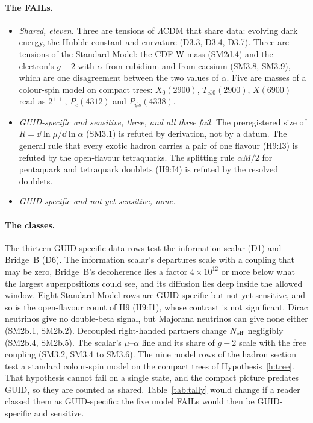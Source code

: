 \paragraph{The FAILs.}
\begin{itemize}[nosep,leftmargin=*]
\item \emph{Shared, eleven.} Three are tensions of $\Lambda$CDM that share data: evolving dark energy, the Hubble constant and curvature
(D3.3, D3.4, D3.7). Three are tensions of the Standard Model: the CDF W mass (SM2d.4) and the electron's $g-2$ with $\alpha$ from rubidium
and from caesium (SM3.8, SM3.9), which are one disagreement between the two values of $\alpha$. Five are masses of a colour-spin model on
compact trees: $X_0(2900)$, $T_{c\bar s0}(2900)$, $X(6900)$ read as $2^{++}$, $P_c(4312)$ and $P_{\psi s}(4338)$.
\item \emph{GUID-specific and sensitive, three, and all three fail.} The preregistered size of $R=\dd\ln\mu/\dd\ln\alpha$ (SM3.1) is refuted
by derivation, not by a datum. The general rule that every exotic hadron carries a pair of one flavour (H9:I3) is refuted by the
open-flavour tetraquarks. The splitting rule $\alpha M/2$ for pentaquark and tetraquark doublets (H9:I4) is refuted by the resolved
doublets.
\item \emph{GUID-specific and not yet sensitive, none.}
\end{itemize}

\paragraph{The classes.} The thirteen GUID-specific data rows test the information scalar (D1) and Bridge~B (D6). The information scalar's
departures scale with a coupling that may be zero, Bridge~B's decoherence lies a factor $4\times10^{12}$ or more below what the largest
superpositions could see, and its diffusion lies deep inside the allowed window. Eight Standard Model rows are GUID-specific but not yet sensitive, and so is the open-flavour count of H9 (H9:I1), whose
contrast is not significant. Dirac neutrinos give no double-beta signal, but
Majorana neutrinos can give none either (SM2b.1, SM2b.2). Decoupled right-handed partners change $N_{\rm eff}$ negligibly (SM2b.4, SM2b.5).
The scalar's $\mu$--$\alpha$ line and its share of $g-2$ scale with the free coupling (SM3.2, SM3.4 to SM3.6). The nine model rows of the hadron section test a
standard colour-spin model on the compact trees of Hypothesis~\ref{h:tree}. That hypothesis cannot fail on a single state, and the compact picture
predates GUID, so they are counted as shared. Table~\ref{tab:tally} would change if a reader classed them as GUID-specific: the five
model FAILs would then be GUID-specific and sensitive.


